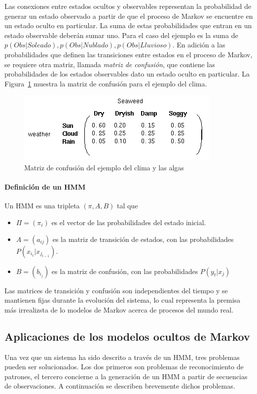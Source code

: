 \documentclass{article}
\begin{document}
Las conexiones entre estados ocultos y observables representan la probabilidad de generar un estado observado a partir de que el proceso de Markov se encuentre en un estado oculto en particular.
La suma de estas probabilidades que entran en un estado observable deberán sumar uno.
Para el caso del ejemplo es la suma de $p(Obs | Soleado), p(Obs | Nublado), p(Obs | Lluvioso)$.
En adición a las probabilidades que definen las transiciones entre estados en el proceso de Markov, se requiere otra matriz, llamada \emph{matriz de confusión}, que contiene las probabilidades de los estados observables dato un estado oculto en particular.
La Figura~\ref{fig:matriz-confusion} muestra la matriz de confusión para el ejemplo del clima.
\begin{figure}[tb]
	\centering
	\includegraphics[scale=0.6]{resources/images/weather-confusion-matrix}
	\caption{Matriz de confusión del ejemplo del clima y las algas}
	\label{fig:matriz-confusion}
\end{figure}

\paragraph{Definición de un HMM} 
\label{par:definición_de_un_hmm}
Un HMM es una tripleta $(\pi,A,B)$ tal que
\begin{itemize}
	\item $\Pi = (\pi _i)$ es el vector de las probabilidades del estado inicial.
	\item $A = ( a_{ij})$ es la matriz de transición de estados, con las probabilidades $P(x_{i_{t}} | x_{j_{t-1}})$.
	\item $B = (b_{i_{j}})$ es la matriz de confusión, con las probabilidades $P(y_t | x_j)$
\end{itemize}
Las matrices de transición y confusión son independientes del tiempo y se mantienen fijas durante la evolución del sistema, lo cual representa la premisa más irrealizsta de lo modelos de Markov acerca de procesos del mundo real.

\subsection{Aplicaciones de los modelos ocultos de Markov}
\label{sub:aplicaciones_de_los_hmms}
Una vez que un sistema ha sido descrito a través de un HMM, tres problemas pueden ser solucionados.
Los dos primeros son problemas de reconocimiento de patrones, el tercero concierne a la generación de un HMM a partir de secuencias de observaciones.
A continuación se describen brevemente dichos problemas.
\end{document}
